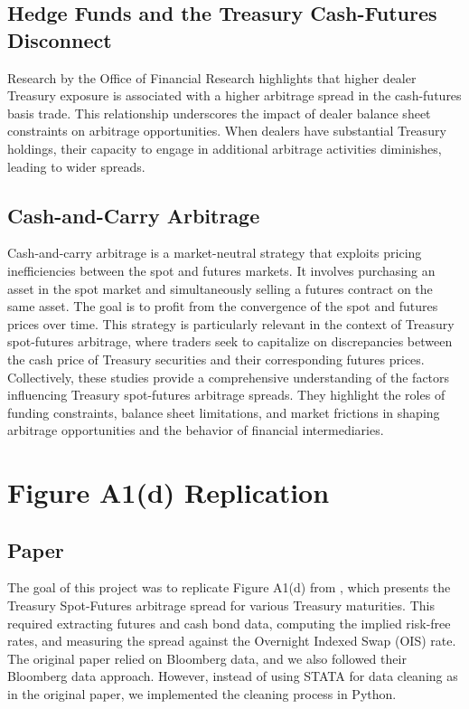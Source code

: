 \documentclass{article}
\begin{document}
\subsection{Hedge Funds and the Treasury Cash-Futures Disconnect}
Research by the Office of Financial Research highlights that higher dealer Treasury exposure is associated with a higher arbitrage spread in the cash-futures basis trade. This relationship underscores the impact of dealer balance sheet constraints on arbitrage opportunities. When dealers have substantial Treasury holdings, their capacity to engage in additional arbitrage activities diminishes, leading to wider spreads.

\subsection{Cash-and-Carry Arbitrage}
Cash-and-carry arbitrage is a market-neutral strategy that exploits pricing inefficiencies between the spot and futures markets. It involves purchasing an asset in the spot market and simultaneously selling a futures contract on the same asset. The goal is to profit from the convergence of the spot and futures prices over time. This strategy is particularly relevant in the context of Treasury spot-futures arbitrage, where traders seek to capitalize on discrepancies between the cash price of Treasury securities and their corresponding futures prices. Collectively, these studies provide a comprehensive understanding of the factors influencing Treasury spot-futures arbitrage spreads. They highlight the roles of funding constraints, balance sheet limitations, and market frictions in shaping arbitrage opportunities and the behavior of financial intermediaries.




\newpage



\section{Figure A1(d) Replication}
\subsection{Paper}

The goal of this project was to replicate Figure A1(d) from \cite{siriwardane2023segmented}, which presents the Treasury Spot-Futures arbitrage spread for various Treasury maturities. This required extracting futures and cash bond data, computing the implied risk-free rates, and measuring the spread against the Overnight Indexed Swap (OIS) rate. The original paper relied on Bloomberg data, and we also followed their Bloomberg data approach. However, instead of using STATA for data cleaning as in the original paper, we implemented the cleaning process in Python.
\end{document}
